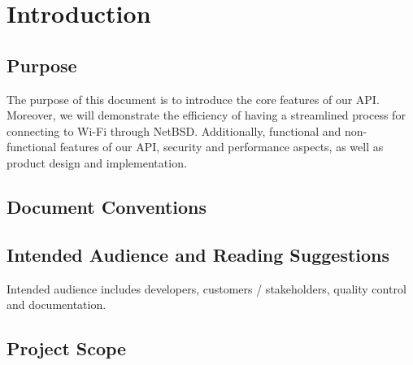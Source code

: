 \section{Introduction}

\subsection{Purpose}

The purpose of this document is to introduce the core features of our API. Moreover, we will demonstrate 
the efficiency of having a streamlined process for connecting to Wi-Fi through NetBSD. Additionally, functional 
and non-functional features of our API, security and performance aspects, as well as product design and implementation. 

\subsection{Document Conventions}

\subsection{Intended Audience and Reading Suggestions}

Intended audience includes developers, customers / stakeholders, quality control and documentation. 

\subsection{Project Scope}

